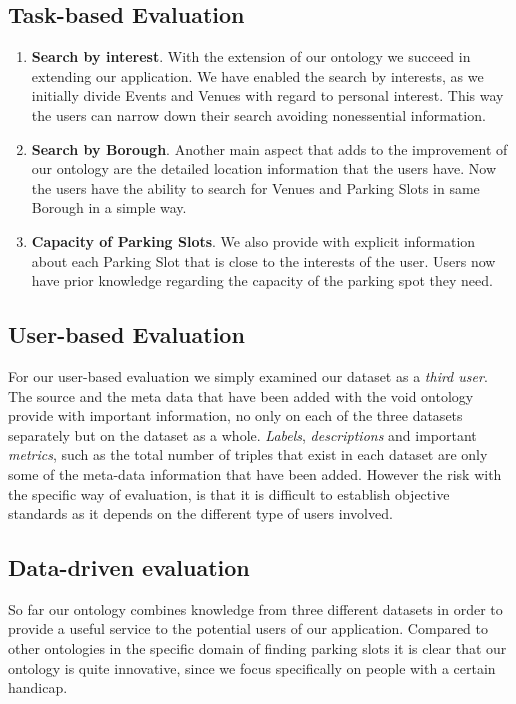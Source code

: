 \documentclass[runningheads,a4paper]{../../StyleFiles/llncs}
\begin{document}
\subsection{Task-based Evaluation}
\begin{enumerate}
	\item \textbf{Search by interest}.
	With the extension of our ontology we succeed in extending our application. We have enabled the search by interests, as we initially divide Events and Venues with regard to personal interest. This way the users can narrow down their search avoiding nonessential information.
	
	\item \textbf{Search by Borough}. Another main aspect that adds to the improvement of our ontology are the detailed location information that the users have. Now the users have the ability to search for Venues and Parking Slots in same Borough in a simple way.
	
	\item \textbf{Capacity of Parking Slots}. We also provide with explicit information about each Parking Slot that is close to the interests of the user. Users now have prior knowledge regarding the capacity of the parking spot they need.
\end{enumerate}

\subsection{User-based Evaluation}
For our user-based evaluation we simply examined our dataset as a \textit{third user}. The source and the meta data that have been added with the void ontology provide with important information, no only on each of the three datasets separately but on the dataset as a whole. \textit{Labels}, \textit{descriptions} and important \textit{metrics}, such as the total number of triples that exist in each dataset are only some of the meta-data information that have been added. However the risk with the specific way of evaluation, is that it is difficult to establish objective standards as it depends on the different type of users involved.

\subsection{Data-driven evaluation}
So far our ontology combines knowledge from three different datasets in order to provide a useful service to the potential users of our application. Compared to other ontologies in the specific domain of finding parking slots it is clear that our ontology is quite innovative, since we focus specifically on people with a certain handicap. 
\end{document}
